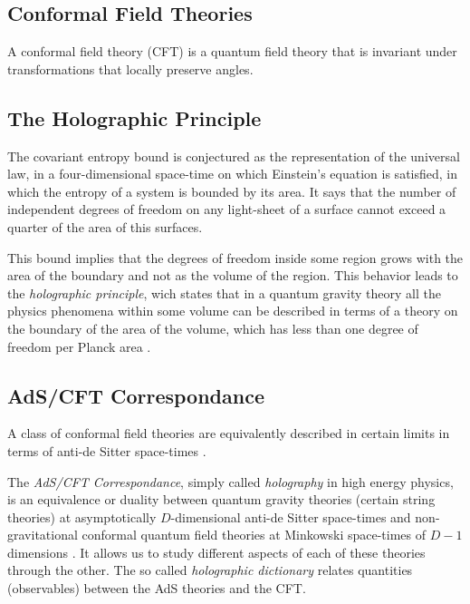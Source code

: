 \documentclass[lettersize,journal]{IEEEtran}
\begin{document}
\subsection{Conformal Field Theories}

A conformal field theory (CFT) is a quantum field theory that is invariant under transformations that locally preserve angles.


\subsection{The Holographic Principle}

The covariant entropy bound \cite{bousso_covariant_1999} is conjectured as the representation of the universal law, in a four-dimensional space-time on which Einstein’s equation is satisfied, in which the entropy of a system is bounded by its area. It says that the number of independent degrees of freedom on any light-sheet of a surface cannot exceed a quarter of the area of this surfaces.

This bound implies that the degrees of freedom inside some region grows with the area of the boundary and not as the volume of the region. This behavior leads to the \textit{holographic principle}, wich states that in a quantum gravity theory all the physics phenomena within some volume can be described in terms of a theory on the boundary of the area of the volume, which has less than one degree of freedom per Planck area \cite{t_hooft_dimensional_2009}.


\subsection{AdS/CFT Correspondance}

A class of conformal field theories are equivalently described in certain limits in terms of anti-de Sitter space-times \cite{rangamani_holographic_2017}.

The \textit{AdS/CFT Correspondance}, simply called \textit{holography} in high energy physics, is an equivalence or duality between quantum gravity theories (certain string theories) at asymptotically $D$-dimensional anti-de Sitter space-times and non-gravitational conformal quantum field theories at Minkowski space-times of $D-1$ dimensions \cite{maldacena_large_1999}. It allows us to study different aspects of each of these theories through the other. The so called \textit{holographic dictionary} relates quantities (observables) between the AdS theories and the CFT. %
\end{document}
